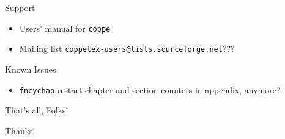 \documentclass[style=coppe,mode=present,paper=a4paper]{powerdot}
\begin{document}
\begin{slide}{Support}
\vspace*{1cm}
\begin{itemize}
\item Users' manual for \texttt{coppe}
\item Mailing list \texttt{coppetex-users@lists.sourceforge.net}???
\end{itemize}
\end{slide}

\begin{slide}{Known Issues}
\vspace*{1cm}
\begin{itemize}
\item \texttt{fncychap} restart chapter and section counters in appendix, anymore?
\end{itemize}
\end{slide}

\begin{slide}{That's all, Folks!}
\vspace*{\fill}
\begin{center}
\Huge Thanks!
\end{center}
\vspace*{\fill}
\end{slide}
\end{document}
